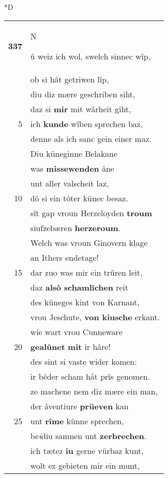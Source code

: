 \documentclass[8pt,a4paper,notitlepage]{article}
\begin{document}
\begin{table}[ht]
\begin{minipage}[t]{0.5\linewidth}
\small
\begin{center}*D
\end{center}
\begin{tabular}{rl}
\textbf{337} & \begin{large}N\end{large}û weiz ich wol, swelch sinnec wîp,\\ 
 & ob si hât getriwen lîp,\\ 
 & diu diz mære geschriben siht,\\ 
 & daz si \textbf{mir} mit wârheit giht,\\ 
5 & ich \textbf{kunde} wîben sprechen baz,\\ 
 & denne als ich sanc gein einer maz.\\ 
 & Diu küneginne Belakane\\ 
 & was \textbf{missewenden} âne\\ 
 & unt aller valscheit laz,\\ 
10 & dô si ein tôter künec besaz.\\ 
 & sît gap vroun Herzeloyden \textbf{troum}\\ 
 & siufzebæren \textbf{herzeroum}.\\ 
 & Welch was vroun Ginovern klage\\ 
 & an Ithers endetage!\\ 
15 & dar zuo was mir ein trûren leit,\\ 
 & daz \textbf{alsô schamlîchen} reit\\ 
 & des küneges kint von Karnant,\\ 
 & vrou Jeschute, \textbf{von kiusche} erkant.\\ 
 & wie wart vrou Cunneware\\ 
20 & \textbf{gealûnet} \textbf{mit} ir hâre!\\ 
 & des sint si vaste wider komen:\\ 
 & ir bêder scham hât prîs genomen.\\ 
 & ze machene nem diz mære ein man,\\ 
 & der âventiure \textbf{prüeven} kan\\ 
25 & unt \textbf{rîme} künne sprechen,\\ 
 & be\textit{i}diu samnen unt \textbf{zerbrechen}.\\ 
 & ich tætez \textbf{iu} gerne vürbaz kunt,\\ 
 & wolt ez gebieten mir ein munt,\\ 

\end{tabular}
\end{minipage}
\end{table}
\end{document}
